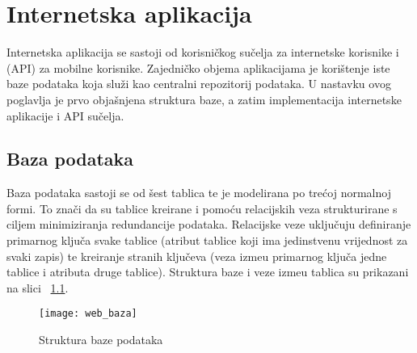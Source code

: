 
\chapter{Internetska aplikacija}

Internetska aplikacija se sastoji od korisni\v{c}kog su\v{c}elja za internetske korisnike i (API) za mobilne korisnike. Zajedni\v{c}ko objema aplikacijama je kori\v{s}tenje iste baze podataka koja slu\v{z}i kao centralni repozitorij podataka. U nastavku ovog poglavlja je prvo obja\v{s}njena struktura baze, a zatim implementacija internetske aplikacije i API su\v{c}elja.

\section{Baza podataka}

Baza podataka sastoji se od \v{s}est tablica te je modelirana po tre\'{c}oj normalnoj formi. To zna\v{c}i da su tablice kreirane i pomo\'{c}u relacijskih veza strukturirane s ciljem minimiziranja redundancije podataka. Relacijske veze uklju\v{c}uju definiranje primarnog klju\v{c}a svake tablice (atribut tablice koji ima jedinstvenu vrijednost za svaki zapis) te kreiranje stranih klju\v{c}eva (veza izme\dj u primarnog klju\v{c}a jedne tablice i atributa druge tablice). Struktura baze i veze izme\dj u tablica su prikazani na slici ~\ref{fig:bazaPodataka}.


\begin{figure}[!htbp]
	\begin{center}
 \texttt{[image: web\_baza]}
 \caption{Struktura baze podataka}
 \label{fig:bazaPodataka}
	\end{center}
\end{figure}

